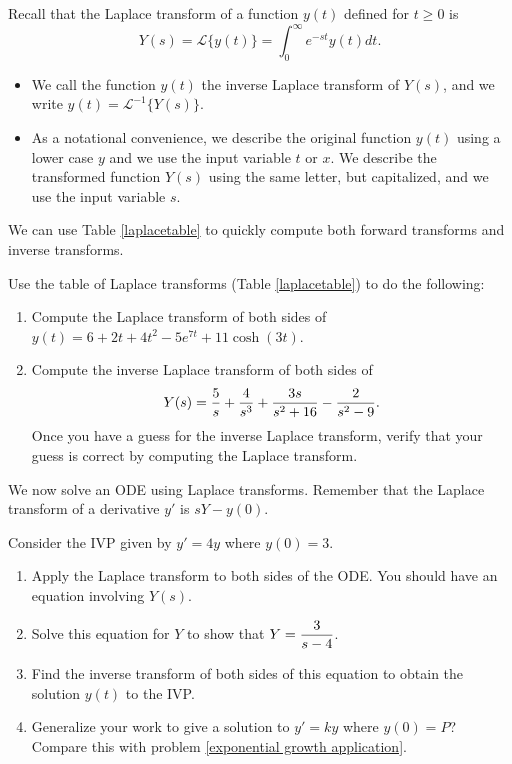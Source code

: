 \mysubsection{\ideaC}

Recall that the Laplace transform of a function $y(t)$ defined for $t\geq 0$ is $$Y(s)=\mathscr{L}\{y(t)\}=\int_0^\infty e^{-st}y(t)dt.$$ 
\begin{itemize}
 \item We call the function $y(t)$ the inverse Laplace transform of $Y(s)$, and we write $y(t)=\mathscr{L}^{-1}\{Y(s)\}$. 
 \item As a notational convenience, we describe the original function $y(t)$ using a lower case $y$ and we use the input variable $t$ or $x$. 
 We describe the transformed function $Y(s)$ using the same letter, but capitalized, and we use the input variable $s$.
\end{itemize}

We can use Table \ref{laplacetable} to quickly compute both forward transforms and inverse transforms.
\begin{problem}
 Use the table of Laplace transforms (Table \ref{laplacetable}) to do the following:
\begin{enumerate}
 \item 
{}%
Compute the Laplace transform of both sides of $y(t) = 6+2t+4t^2-5e^{7t}+11\cosh(3t)$. 
 \item Compute the inverse Laplace transform of both sides of $$\displaystyle Y(s) = \frac{5}{s}+\frac{4}{s^3}+\frac{3s}{s^2+16}-\frac{2}{s^2-9}.$$ 
 Once you have a guess for the inverse Laplace transform, verify that your guess is correct by computing the Laplace transform.
\end{enumerate}
\end{problem}

We now solve an ODE using Laplace transforms. Remember that the Laplace transform of a derivative $y'$ is $sY-y(0)$. 
\begin{problem}
%
 Consider the IVP given by $y'=4y$ where $y(0)=3$.  
 \begin{enumerate}
  \item Apply the Laplace transform to both sides of the ODE. You should have an equation involving $Y(s)$. 
  \item Solve this equation for $Y$ to show that $\displaystyle Y = \frac{3}{s-4}$. 
  \item Find the inverse transform of both sides of this equation to obtain the solution $y(t)$ to the IVP.  
  \item Generalize your work to give a solution to $y'=ky$ where $y(0) = P$?  Compare this with problem \ref{exponential growth application}.
 \end{enumerate}
\end{problem}

